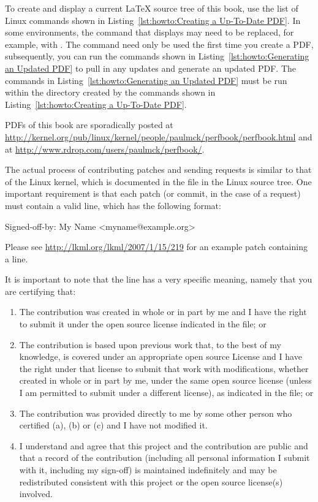 To create and display a current \LaTeX{} source tree of this book,
use the list of Linux commands shown in
Listing~\ref{lst:howto:Creating a Up-To-Date PDF}.
In some environments, the  command that displays 
may need to be replaced, for example, with .
The  command need only be used the first time you
create a PDF, subsequently, you can run the commands shown in
Listing~\ref{lst:howto:Generating an Updated PDF} to pull in any updates
and generate an updated PDF.
The commands in
Listing~\ref{lst:howto:Generating an Updated PDF}
must be run within the  directory created by the commands
shown in
Listing~\ref{lst:howto:Creating a Up-To-Date PDF}.

PDFs of this book are sporadically posted at
\url{http://kernel.org/pub/linux/kernel/people/paulmck/perfbook/perfbook.html}
and at
\url{http://www.rdrop.com/users/paulmck/perfbook/}.

The actual process of contributing patches and sending 
requests is similar to that of the Linux kernel, which is documented
in the  file in the Linux source tree.
One important requirement is that each patch (or commit, in the case
of a  request) must contain a valid  line,
which has the following format:

\begin{VerbatimU}
Signed-off-by: My Name <myname@example.org>
\end{VerbatimU}

Please see \url{http://lkml.org/lkml/2007/1/15/219} for an example
patch containing a  line.

It is important to note that the  line has
a very specific meaning, namely that you are certifying that:

\begin{enumerate}[label={(\alph*)}]
\item	The contribution was created in whole or in part
	by me and I have the right to submit it under
	the open source license indicated in the file; or
\item	The contribution is based upon previous work
	that, to the best of my knowledge, is covered
	under an appropriate open source License and I
	have the right under that license to submit that
	work with modifications, whether created in whole
	or in part by me, under the same open source
	license (unless I am permitted to submit under
	a different license), as indicated in the file; or
\item	The contribution was provided directly to me by
	some other person who certified (a), (b) or (c)
	and I have not modified it.
\item	I understand and agree that this project and the
	contribution are public and that a record of the
	contribution (including all personal information
	I submit with it, including my sign-off) is
	maintained indefinitely and may be redistributed
	consistent with this project or the open source
	license(s) involved.
\end{enumerate}

